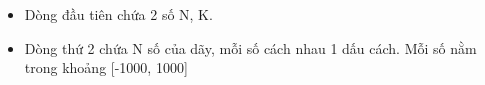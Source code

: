 \begin{itemize}
	\item     Dòng đầu tiên chứa 2 số N, K.   
\end{itemize}
\begin{itemize}
	\item     Dòng thứ 2 chứa N số của dãy, mỗi số cách nhau 1 dấu cách. Mỗi số nằm trong khoảng [-1000, 1000]   
\end{itemize}